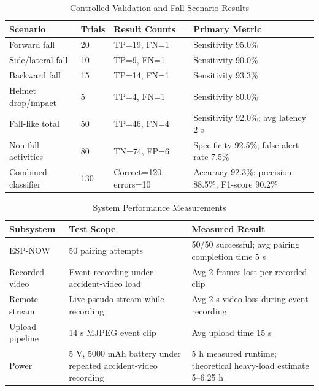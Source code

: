 \documentclass[conference]{IEEEtran}
\begin{document}
\begin{table}[!t]
\caption{Controlled Validation and Fall-Scenario Results}
\label{tab:validation}
\centering
\setlength{\tabcolsep}{3pt}
\begin{tabular}{|p{}|p{}|p{}|p{}|}
\hline
\textbf{Scenario} & \textbf{Trials} & \textbf{Result Counts} & \textbf{Primary Metric} \\
\hline
Forward fall & 20 & TP=19, FN=1 & Sensitivity 95.0\% \\
\hline
Side/lateral fall & 10 & TP=9, FN=1 & Sensitivity 90.0\% \\
\hline
Backward fall & 15 & TP=14, FN=1 & Sensitivity 93.3\% \\
\hline
Helmet drop/impact & 5 & TP=4, FN=1 & Sensitivity 80.0\% \\
\hline
Fall-like total & 50 & TP=46, FN=4 & Sensitivity 92.0\%; avg latency 2 s \\
\hline
Non-fall activities & 80 & TN=74, FP=6 & Specificity 92.5\%; false-alert rate 7.5\% \\
\hline
Combined classifier & 130 & Correct=120, errors=10 & Accuracy 92.3\%; precision 88.5\%; F1-score 90.2\% \\
\hline
\end{tabular}
\end{table}

\begin{table}[!t]
\caption{System Performance Measurements}
\label{tab:systemperf}
\centering
\begin{tabular}{|p{}|p{}|p{}|}
\hline
\textbf{Subsystem} & \textbf{Test Scope} & \textbf{Measured Result} \\
\hline
ESP-NOW & 50 pairing attempts & 50/50 successful; avg pairing completion time 5 s \\
\hline
Recorded video & Event recording under accident-video load & Avg 2 frames lost per recorded clip \\
\hline
Remote stream & Live pseudo-stream while recording & Avg 2 s video loss during event recording \\
\hline
Upload pipeline & 14 s MJPEG event clip & Avg upload time 15 s \\
\hline
Power & 5 V, 5000 mAh battery under repeated accident-video recording & 5 h measured runtime; theoretical heavy-load estimate 5--6.25 h \\
\hline
\end{tabular}
\end{table}
\end{document}
